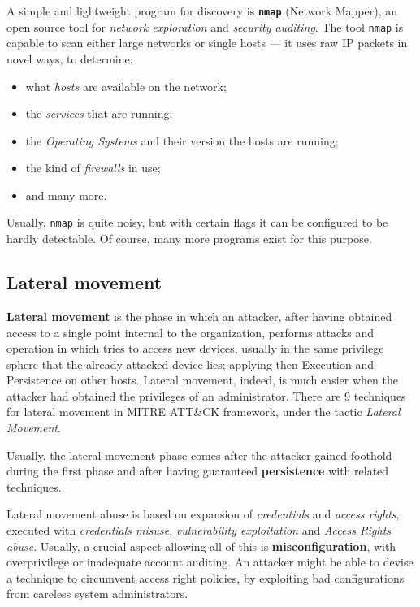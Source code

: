 \documentclass[10pt]{\classname}
\begin{document}
A simple and lightweight program for discovery is \textbf{\texttt{nmap}}
(Network Mapper), an open source tool for \emph{network exploration} and
\emph{security auditing}. The tool \texttt{nmap} is capable to scan either
large networks or single hosts --- it uses raw IP packets in novel ways, to
determine:
\begin{itemize}
    \item what \emph{hosts} are available on the network;
    \item the \emph{services} that are running;
    \item the \emph{Operating Systems} and their version the hosts are running;
    \item the kind of \emph{firewalls} in use;
    \item and many more.
\end{itemize}

Usually, \texttt{nmap} is quite noisy, but with certain flags it can be
configured to be hardly detectable. Of course, many more programs exist for
this purpose.


\subsection{Lateral movement}

\textbf{Lateral movement} is the phase in which an attacker, after having
obtained access to a single point internal to the organization, performs
attacks and operation in which tries to access new devices, usually in the same
privilege sphere that the already attacked device lies; applying then Execution
and Persistence on other hosts. Lateral movement, indeed, is much easier when
the attacker had obtained the privileges of an administrator. There are 9
techniques for lateral movement in MITRE ATT\&CK framework, under the tactic
\emph{Lateral Movement}.

Usually, the lateral movement phase comes after the attacker gained foothold
during the first phase and after having guaranteed \textbf{persistence} with
related techniques.

Lateral movement abuse is based on expansion of \emph{credentials} and
\emph{access rights}, executed with \emph{credentials misuse},
\emph{vulnerability exploitation} and \emph{Access Rights abuse}. Usually, a
crucial aspect allowing all of this is \textbf{misconfiguration}, with
overprivilege or inadequate account auditing. An attacker might be able to
devise a technique to circumvent access right policies, by exploiting bad
configurations from careless system administrators.
\end{document}
